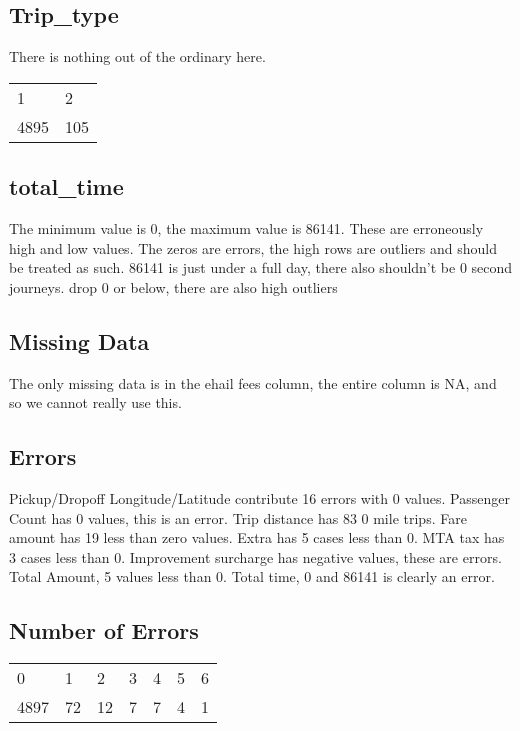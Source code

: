 \documentclass{article}
\begin{document}
\subsection{Trip\_type}
There is nothing out of the ordinary here.
\begin{table}[H]
\centering
\begin{tabular}{ll}
1    & 2    \\
4895 & 105
\end{tabular}
\end{table}

\subsection{total\_time}
The minimum value is 0, the maximum value is 86141. These are erroneously high and low values. The zeros are errors, the high rows are outliers and should be treated as such.
86141 is just under a full day, there also shouldn't be 0 second journeys. drop 0 or below, there are also high outliers

\subsection{Missing Data}
The only missing data is in the ehail fees column, the entire column is NA, and so we cannot really use this.

\subsection{Errors}
Pickup/Dropoff Longitude/Latitude contribute 16 errors with 0 values.
Passenger Count has 0 values, this is an error.
Trip distance has 83 0 mile trips.
Fare amount has 19 less than zero values.
Extra has 5 cases less than 0.
MTA tax has 3 cases less than 0.
Improvement surcharge has negative values, these are errors.
Total Amount, 5 values less than 0.
Total time, 0 and 86141 is clearly an error.

\subsection{Number of Errors}
\begin{table}[H]
\centering
\begin{tabular}{lllllll}
   0  &  1 &   2  &  3   & 4  &  5  &  6 \\
4897 &  72 &  12  &  7  &  7   & 4 &   1
\end{tabular}
\end{table}
\end{document}
